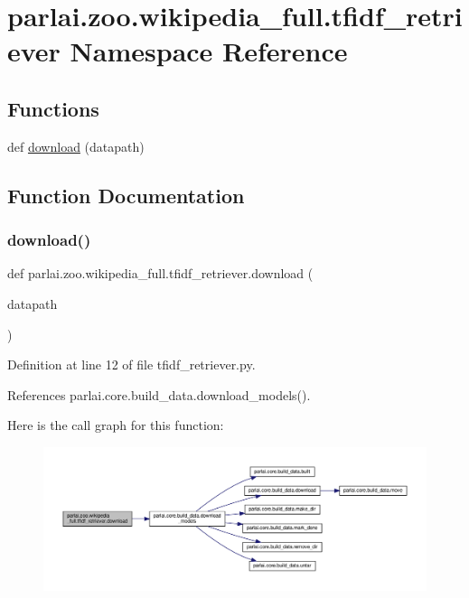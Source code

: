 \hypertarget{namespaceparlai_1_1zoo_1_1wikipedia__full_1_1tfidf__retriever}{}\section{parlai.\+zoo.\+wikipedia\+\_\+full.\+tfidf\+\_\+retriever Namespace Reference}
\label{namespaceparlai_1_1zoo_1_1wikipedia__full_1_1tfidf__retriever}
\subsection*{Functions}
\begin{DoxyCompactItemize}
\item 
def \hyperlink{namespaceparlai_1_1zoo_1_1wikipedia__full_1_1tfidf__retriever_ae4ca3b13b024e2db9313c275cfcdfac7}{download} (datapath)
\end{DoxyCompactItemize}


\subsection{Function Documentation}
\mbox{\label{namespaceparlai_1_1zoo_1_1wikipedia__full_1_1tfidf__retriever_ae4ca3b13b024e2db9313c275cfcdfac7}} 
\subsubsection{\texorpdfstring{download()}{download()}}
{\footnotesize\ttfamily def parlai.\+zoo.\+wikipedia\+\_\+full.\+tfidf\+\_\+retriever.\+download (\begin{DoxyParamCaption}\item[{}]{datapath }\end{DoxyParamCaption})}



Definition at line 12 of file tfidf\+\_\+retriever.\+py.



References parlai.\+core.\+build\+\_\+data.\+download\+\_\+models().

Here is the call graph for this function\+:
\nopagebreak
\begin{figure}[H]
\begin{center}
\leavevmode
\includegraphics[width=350pt]{namespaceparlai_1_1zoo_1_1wikipedia__full_1_1tfidf__retriever_ae4ca3b13b024e2db9313c275cfcdfac7_cgraph}
\end{center}
\end{figure}

